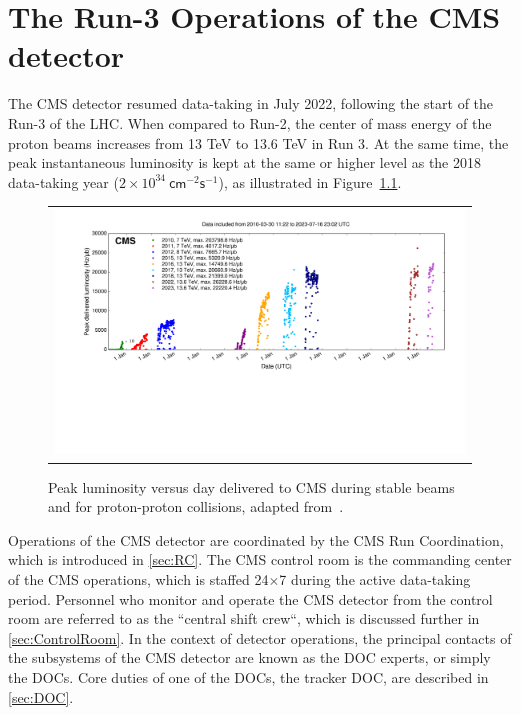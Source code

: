 \chapter{The Run-3 Operations of the CMS detector}
\label{chap:Ops}

The \ac{CMS} detector resumed data-taking in July 2022, following the start of the Run-3 of the \ac{LHC}. When compared to Run-2, the center of mass energy of the proton beams increases from 13 TeV to 13.6 TeV in Run 3. At the same time, the peak instantaneous luminosity is kept at the same or higher level as the 2018 data-taking year ($2\times10^{34}~\textsf{cm}^{-2}\textsf{s}^{-1}$), as illustrated in Figure~\ref{fig:peak}.

\begin{figure}[tbh!]
 \begin{center}
 \begin{tabular}{c}
 \includegraphics[width=\textwidth]{figures/Part2/Operation/peak_lumi_pp}
 \end{tabular}
 \caption{Peak luminosity versus day delivered to \ac{CMS} during stable beams and for proton-proton collisions, adapted from~\cite{twiki:lumi}.}
 \label{fig:peak}
 \end{center}
\end{figure}

Operations of the \ac{CMS} detector are coordinated by the \ac{CMS} Run Coordination, which is introduced in \autoref{sec:RC}. The \ac{CMS} control room is the commanding center of the \ac{CMS} operations, which is staffed 24$\times$7 during the active data-taking period. Personnel who monitor and operate the \ac{CMS} detector from the control room are referred to as the ``central shift crew``, which is discussed further in \autoref{sec:ControlRoom}. In the context of detector operations, the principal contacts of the subsystems of the \ac{CMS} detector are known as the \ac{DOC} experts, or simply the \acp{DOC}. Core duties of one of the \acp{DOC}, the tracker \ac{DOC}, are described in \autoref{sec:DOC}.

